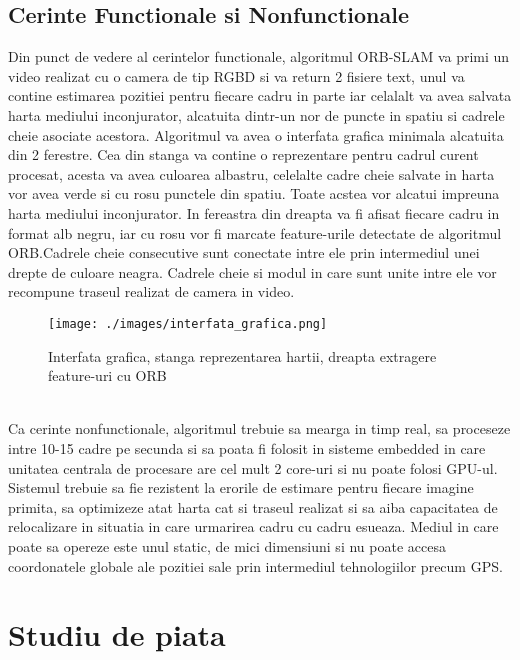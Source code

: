 \documentclass[12pt,a4paper]{report}
\begin{document}
\section{Cerinte Functionale si Nonfunctionale}
Din punct de vedere al cerintelor functionale, algoritmul ORB-SLAM va primi 
un video realizat cu o camera de tip RGBD si va return 2 fisiere text, unul va contine
estimarea pozitiei pentru fiecare cadru in parte iar celalalt va avea salvata harta 
mediului inconjurator, alcatuita dintr-un nor de puncte in spatiu si cadrele cheie
asociate acestora. Algoritmul va avea o interfata grafica minimala alcatuita din 2 
ferestre. Cea din stanga va contine o reprezentare pentru cadrul curent procesat, 
acesta va avea culoarea albastru, celelalte cadre cheie salvate in harta vor avea 
verde si cu rosu punctele din spatiu. Toate acstea vor alcatui impreuna harta mediului
inconjurator. In fereastra din dreapta va fi afisat fiecare cadru in format alb negru,
iar cu rosu vor fi marcate feature-urile detectate de algoritmul ORB.\@ Cadrele cheie 
consecutive sunt conectate intre ele prin intermediul unei drepte de culoare neagra.
Cadrele cheie si modul in care sunt unite intre ele vor recompune traseul realizat de camera in video. 
\begin{figure}[htbp] 
  \centering
  \texttt{[image: ./images/interfata\_grafica.png]}
  \caption{Interfata grafica, stanga reprezentarea hartii, dreapta extragere feature-uri cu ORB}
  \label{fig:exemplu_imagine}
\end{figure}  \\         
Ca cerinte nonfunctionale, algoritmul trebuie sa mearga in timp real, sa 
proceseze intre 10{-}15 cadre pe secunda si sa poata fi folosit in sisteme embedded
in care unitatea centrala de procesare are cel mult 2 core-uri si nu poate folosi GPU-ul.
Sistemul trebuie sa fie
rezistent la erorile de estimare pentru fiecare imagine primita, sa optimizeze atat
harta cat si traseul realizat si sa aiba capacitatea de relocalizare in situatia in care
urmarirea cadru cu cadru esueaza. Mediul in care poate sa opereze este unul static, de
mici dimensiuni si nu poate accesa coordonatele globale ale pozitiei sale prin intermediul
tehnologiilor precum GPS.\@

\chapter{Studiu de piata}
\end{document}
